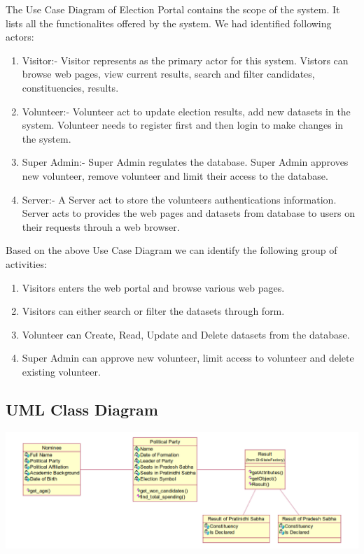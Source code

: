 \documentclass[12pt, a4paper, titlepage]{report}
\begin{document}
The Use Case Diagram of Election Portal contains the scope of the system. It lists all the functionalites offered by the system. We had identified following actors:
\begin{enumerate}
\item Visitor:- Visitor represents as the primary actor for this system. Vistors can browse web pages, view current results, search and filter candidates, constituencies, results.

\item Volunteer:- Volunteer act to update election results, add new datasets in the system. Volunteer needs to register first and then login to make changes in the system.

\item Super Admin:- Super Admin regulates the database. Super Admin approves new volunteer, remove volunteer and limit their access to the database.

\item Server:- A Server act to store the volunteers authentications information. Server acts to provides the web pages and datasets from database to users on their requests throuh a web browser. 
\end{enumerate}

Based on the above Use Case Diagram we can identify the following group of activities:

\begin{enumerate}
\item Visitors enters the web portal and browse various web pages.

\item Visitors can either search or filter the datasets through form.

\item Volunteer can Create, Read, Update and Delete datasets from the database.

\item Super Admin can approve new volunteer, limit access to volunteer and delete existing volunteer.
\end{enumerate}
\subsection{UML Class Diagram}
\begin{center}
\includegraphics[scale=0.5]{political_party.png}

\end{center}
\end{document}
